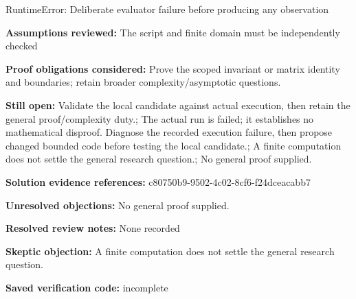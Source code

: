 \documentclass[11pt]{article}
\begin{document}
RuntimeError: Deliberate evaluator failure before producing any observation\par
\textbf{Assumptions reviewed:} The script and finite domain must be independently checked\par
\textbf{Proof obligations considered:} Prove the scoped invariant or matrix identity and boundaries; retain broader complexity/asymptotic questions.\par
\textbf{Still open:} Validate the local candidate against actual execution, then retain the general proof/complexity duty.; The actual run is failed; it establishes no mathematical disproof. Diagnose the recorded execution failure, then propose changed bounded code before testing the local candidate.; A finite computation does not settle the general research question.; No general proof supplied.\par
\textbf{Solution evidence references:} c80750b9-9502-4c02-8cf6-f24dceacabb7\par
\textbf{Unresolved objections:} No general proof supplied.\par
\textbf{Resolved review notes:} None recorded\par
\textbf{Skeptic objection:} A finite computation does not settle the general research question.\par
\textbf{Saved verification code:} incomplete\par
\end{document}
